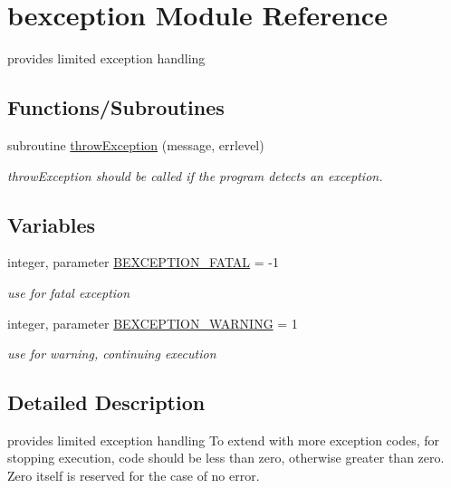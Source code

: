 \hypertarget{namespacebexception}{
\section{bexception Module Reference}
\label{namespacebexception}
}


provides limited exception handling  


\subsection*{Functions/Subroutines}
\begin{DoxyCompactItemize}
\item 
subroutine \hyperlink{namespacebexception_ab1589d4ac40e6a8d667205910c28cd35}{throwException} (message, errlevel)
\begin{DoxyCompactList}\small\item\em throwException should be called if the program detects an exception. \item\end{DoxyCompactList}\end{DoxyCompactItemize}
\subsection*{Variables}
\begin{DoxyCompactItemize}
\item 
integer, parameter \hyperlink{namespacebexception_a0136bbb877e7f3f250df94edc06d6906}{BEXCEPTION\_\-FATAL} = -\/1
\begin{DoxyCompactList}\small\item\em use for fatal exception \item\end{DoxyCompactList}\item 
integer, parameter \hyperlink{namespacebexception_a8f7fabc18e6fc4a081836a0e0401b94c}{BEXCEPTION\_\-WARNING} = 1
\begin{DoxyCompactList}\small\item\em use for warning, continuing execution \item\end{DoxyCompactList}\end{DoxyCompactItemize}


\subsection{Detailed Description}
provides limited exception handling To extend with more exception codes, for stopping execution, code should be less than zero, otherwise greater than zero. Zero itself is reserved for the case of no error. 

